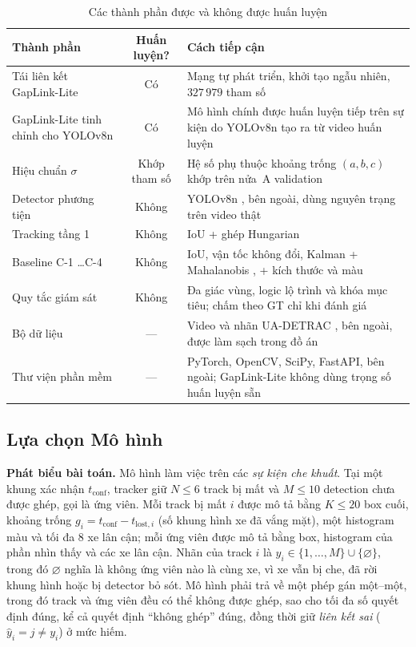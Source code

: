 \begin{table}[H]
    \centering
    \caption{Các thành phần được và không được huấn luyện}
    \label{tab:trained_components}
    \begin{tabularx}{\textwidth}{l c X}
        \toprule
        \textbf{Thành phần} & \textbf{Huấn luyện?} & \textbf{Cách tiếp cận} \\
        \midrule
        Tái liên kết GapLink-Lite & Có & Mạng tự phát triển, khởi tạo ngẫu nhiên, $327\,979$ tham số \\
        GapLink-Lite tinh chỉnh cho YOLOv8n & Có & Mô hình chính được huấn luyện tiếp trên sự kiện do YOLOv8n tạo ra từ video huấn luyện \\
        Hiệu chuẩn $\sigma$ & Khớp tham số & Hệ số phụ thuộc khoảng trống $(a,b,c)$ khớp trên nửa~A validation \\
        Detector phương tiện & Không & YOLOv8n \cite{jocher2023yolov8}, bên ngoài, dùng nguyên trạng trên video thật \\
        Tracking tầng 1 & Không & IoU + ghép Hungarian \cite{kuhn1955hungarian} \\
        Baseline C-1 \dots C-4 & Không & IoU, vận tốc không đổi, Kalman \cite{kalman1960} + Mahalanobis \cite{mahalanobis1936}, + kích thước và màu \\
        Quy tắc giám sát & Không & Đa giác vùng, logic lộ trình và khóa mục tiêu; chấm theo GT chỉ khi đánh giá \\
        Bộ dữ liệu & --- & Video và nhãn UA-DETRAC \cite{wen2020uadetrac}, bên ngoài, được làm sạch trong đồ án \\
        Thư viện phần mềm & --- & PyTorch, OpenCV, SciPy, FastAPI, bên ngoài; GapLink-Lite không dùng trọng số huấn luyện sẵn \\
        \bottomrule
    \end{tabularx}
\end{table}

\subsection{Lựa chọn Mô hình}
\label{sec:model_selection}

\textbf{Phát biểu bài toán.} Mô hình làm việc trên các \emph{sự kiện che khuất}. Tại một khung xác nhận $t_{\text{conf}}$, tracker giữ $N \le 6$ track bị mất và $M \le 10$ detection chưa được ghép, gọi là ứng viên. Mỗi track bị mất $i$ được mô tả bằng $K \le 20$ box cuối, khoảng trống $g_i = t_{\text{conf}} - t_{\text{lost},i}$ (số khung hình xe đã vắng mặt), một histogram màu và tối đa $8$ xe lân cận; mỗi ứng viên được mô tả bằng box, histogram của phần nhìn thấy và các xe lân cận. Nhãn của track $i$ là $y_i \in \{1,\dots,M\} \cup \{\varnothing\}$, trong đó $\varnothing$ nghĩa là không ứng viên nào là cùng xe, vì xe vẫn bị che, đã rời khung hình hoặc bị detector bỏ sót. Mô hình phải trả về một phép gán một--một, trong đó track và ứng viên đều có thể không được ghép, sao cho tối đa số quyết định đúng, kể cả quyết định ``không ghép'' đúng, đồng thời giữ \emph{liên kết sai} ($\hat{y}_i = j \ne y_i$) ở mức hiếm.

